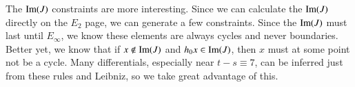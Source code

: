 The $\operatorname{Im}\nolimits(J)$ constraints are more interesting.
Since we can calculate the $\operatorname{Im}\nolimits(J)$ directly on the $E_2$ page, we can generate a few constraints.  
Since the $\operatorname{Im}\nolimits(J)$ must last until $E_\infty$, we know these elements are always cycles and never boundaries.
Better yet, we know that if $x\notin\operatorname{Im}\nolimits(J)$ and $h_0x\in\operatorname{Im}\nolimits(J)$, then $x$ must at some point not be a cycle.  
Many differentials, especially near $t-s\equiv 7$, can be inferred just from these rules and Leibniz, so we take great advantage of this.  


  








